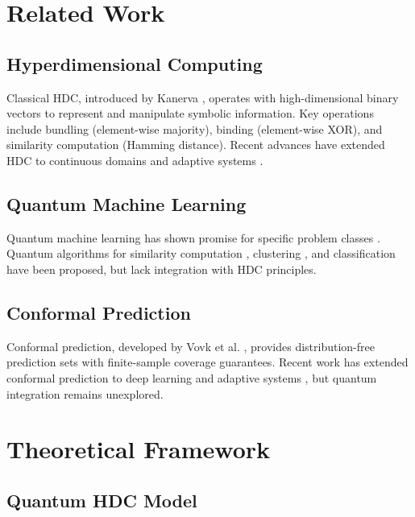 \documentclass[10pt,twocolumn,letterpaper]{article}
\begin{document}
\section{Related Work}

\subsection{Hyperdimensional Computing}

Classical HDC, introduced by Kanerva \cite{kanerva2009hyperdimensional}, operates with high-dimensional binary vectors to represent and manipulate symbolic information. Key operations include bundling (element-wise majority), binding (element-wise XOR), and similarity computation (Hamming distance). Recent advances have extended HDC to continuous domains \cite{imani2019voicehd} and adaptive systems \cite{rahimi2016efficient}.

\subsection{Quantum Machine Learning}

Quantum machine learning has shown promise for specific problem classes \cite{cerezo2021variational}. Quantum algorithms for similarity computation \cite{wiebe2014quantum}, clustering \cite{lloyd2013quantum}, and classification \cite{schuld2015introduction} have been proposed, but lack integration with HDC principles.

\subsection{Conformal Prediction}

Conformal prediction, developed by Vovk et al. \cite{vovk2005algorithmic}, provides distribution-free prediction sets with finite-sample coverage guarantees. Recent work has extended conformal prediction to deep learning \cite{angelopoulos2021gentle} and adaptive systems \cite{gibbs2021adaptive}, but quantum integration remains unexplored.

\section{Theoretical Framework}

\subsection{Quantum HDC Model}
\end{document}
